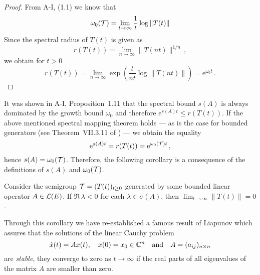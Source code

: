 \begin{proof}
From A-I, (1.1) we know that
\[
    \omega_{0}(\mathcal{T}) = \lim_{t \to \infty} \frac{1}{t} \log \|T(t)\|
\]
Since the spectral radius of $T(t)$ is given as
\[
    r(T(t)) = \lim_{n \to \infty} \|T(nt)\|^{1/n}\,,
\]
we obtain for $t > 0$
\[
    r(T(t)) = \lim_{n \to \infty} \exp\left(\frac{t}{nt} \log \|T(nt)\|\right) = \mathrm{e}^{\omega_{0} t}\,.
\]
\end{proof}
It was shown in A-I, Proposition~1.11 that the spectral bound $s(A)$ is always dominated by the growth bound $\omega_{0}$ and therefore $\mathrm{e}^{s(A)t} \leq r(T(t))$.
If the above mentioned spectral mapping theorem holds --- as is the case for bounded generators (\eg see Theorem~VII.3.11 of \citet{dunfordschwartz:1958}) --- we obtain the equality
\[
    \mathrm{e}^{s(A)t} = r(T(t)) = \mathrm{e}^{\omega_{0}(\mathcal{T}) t}\,,
\]
hence $s(A) = \omega_{0}(\mathcal{T})$.
Therefore, the following corollary is a consequence of the definitions of $s(A)$ and $\omega_{0}(\mathcal{T})$.
\begin{corollary}\label{cor:a3-1.2}
Consider the semigroup $\mathcal{T} = (T(t))_{t \geq 0}$ generated by some bounded linear operator $A \in \mathcal{L}(E)$.
If $\Re\,\lambda < 0$ for each $\lambda \in \sigma(A)$, then $\lim_{t \to \infty}\|T(t)\| = 0$.
\end{corollary}
Through this corollary we have re-established a famous result of Liapunov which assures that the solutions of the linear Cauchy problem
\[
    \dot{x}(t) = Ax(t), \quad x(0) = x_{0} \in \mathbb{C}^{n} \quad \text{and} \quad A = (a_{ij})_{n\times n}
\]
are \emph{stable}, \ie they converge to zero as $t \to \infty$ if the real parts of all eigenvalues of the matrix $A$ are smaller than zero.

